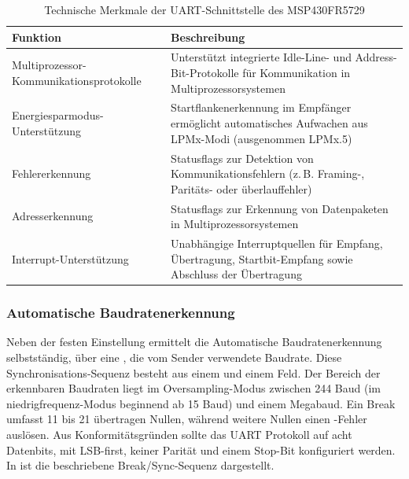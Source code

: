 \begin{table}[h!]
	\small
	\centering
	\begin{tabular}{|p{6.5cm}|p{7.5cm}|}
		\hline
		\textbf{Funktion} & \textbf{Beschreibung} \\
		\hline
		Multiprozessor-Kommunikationsprotokolle & Unterst\"utzt integrierte Idle-Line- und Address-Bit-Protokolle f\"ur Kommunikation in Multiprozessorsystemen \\
		\hline
		Energiesparmodus-Unterst\"utzung & Startflankenerkennung im Empf\"anger erm\"oglicht automatisches Aufwachen aus LPMx-Modi (ausgenommen LPMx.5) \\
		\hline
		Fehlererkennung & Statusflags zur Detektion von Kommunikationsfehlern (z.\,B. Framing-, Parit\"ats- oder \"uberlauffehler) \\
		\hline
		Adresserkennung & Statusflags zur Erkennung von Datenpaketen in Multiprozessorsystemen \\
		\hline
		Interrupt-Unterst\"utzung & Unabh\"angige Interruptquellen f\"ur Empfang, \"Ubertragung, Startbit-Empfang sowie Abschluss der \"Ubertragung \\
		\hline
	\end{tabular}
	\caption{Technische Merkmale der UART-Schnittstelle des MSP430FR5729\\}
	\label{tab:uart_features}
\end{table}

\newpage
\subsubsection{Automatische Baudratenerkennung}
\label{sec:auto_baud}

Neben der festen Einstellung ermittelt die Automatische Baudratenerkennung selbstst\"andig, \"uber eine , die vom Sender verwendete Baudrate. Diese Synchronisations-Sequenz besteht aus einem  und einem  Feld. Der Bereich der erkennbaren Baudraten liegt im Oversampling-Modus zwischen 244 Baud (im niedrigfrequenz-Modus beginnend ab 15 Baud) und einem Megabaud. Ein Break umfasst 11 bis 21 \"ubertragen Nullen, w\"ahrend weitere Nullen einen -Fehler ausl\"osen. Aus Konformit\"atsgr\"unden sollte das UART Protokoll auf acht Datenbits, mit LSB-first, keiner Parit\"at und einem Stop-Bit konfiguriert werden. In  ist die beschriebene Break/Sync-Sequenz dargestellt.


